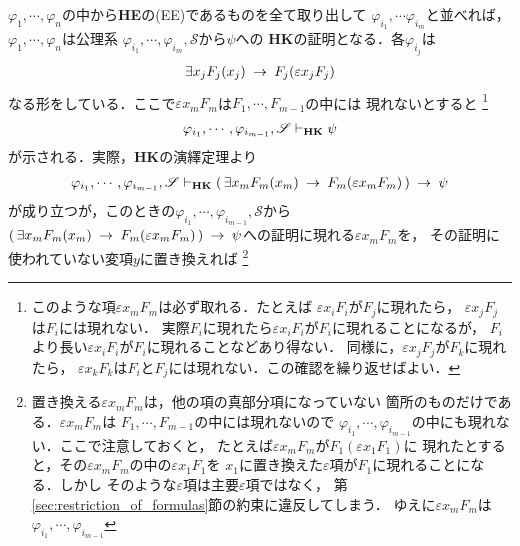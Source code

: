 	\begin{sketch}
		$\varphi_{1},\cdots,\varphi_{n}$の中から{\bf HE}の(EE)であるものを全て取り出して
		$\varphi_{i_{1}},\cdots\varphi_{i_{m}}$と並べれば，
		$\varphi_{1},\cdots,\varphi_{n}$は公理系
		$\varphi_{i_{1}},\cdots,\varphi_{i_{m}},\mathscr{S}$から$\psi$への
		{\bf HK}の証明となる．各$\varphi_{i_{j}}$は
		\begin{align}
			\exists x_{j} F_{j}(x_{j}) \hspace{0.25em}\rightarrow\hspace{0.25em} F_{j}(\varepsilon x_{j} F_{j})
		\end{align}
		なる形をしている．ここで$\varepsilon x_{m} F_{m}$は$F_{1},\cdots,F_{m-1}$の中には
		現れないとすると
		\footnote{
			このような項$\varepsilon x_{m} F_{m}$は必ず取れる．たとえば
			$\varepsilon x_{i} F_{i}$が$F_{j}$に現れたら，
			$\varepsilon x_{j} F_{j}$は$F_{i}$には現れない．
			実際$F_{i}$に現れたら$\varepsilon x_{i} F_{i}$が$F_{i}$に現れることになるが，
			$F_{i}$より長い$\varepsilon x_{i} F_{i}$が$F_{i}$に現れることなどあり得ない．
			同様に，$\varepsilon x_{j} F_{j}$が$F_{k}$に現れたら，
			$\varepsilon x_{k} F_{k}$は$F_{i}$と$F_{j}$には現れない．この確認を繰り返せばよい．
		}
		\begin{align}
			\varphi_{i_{1}},\cdots,\varphi_{i_{m-1}},\mathscr{S} 
			\vdash_{{\scriptsize \mbox{{\bf HK}}}} \psi
		\end{align}
		が示される．実際，{\bf HK}の演繹定理より
		\begin{align}
			\varphi_{i_{1}},\cdots,\varphi_{i_{m-1}},\mathscr{S} 
			\vdash_{{\scriptsize \mbox{{\bf HK}}}} 
			(\, \exists x_{m} F_{m}(x_{m}) \hspace{0.25em}\rightarrow\hspace{0.25em} F_{m}(\varepsilon x_{m} F_{m})\, ) \hspace{0.25em}\rightarrow\hspace{0.25em} \psi
		\end{align}
		が成り立つが，このときの$\varphi_{i_{1}},\cdots,\varphi_{i_{m-1}},\mathscr{S}$から
		$(\, \exists x_{m} F_{m}(x_{m}) \hspace{0.25em}\rightarrow\hspace{0.25em} F_{m}(\varepsilon x_{m} F_{m})\, ) 
		\hspace{0.25em}\rightarrow\hspace{0.25em} \psi$への証明に現れる$\varepsilon x_{m} F_{m}$を，
		その証明に使われていない変項$y$に置き換えれば
		\footnote{
			置き換える$\varepsilon x_{m} F_{m}$は，他の項の真部分項になっていない
			箇所のものだけである．$\varepsilon x_{m} F_{m}$は
			$F_{1},\cdots,F_{m-1}$の中には現れないので
			$\varphi_{i_{1}},\cdots,\varphi_{i_{m-1}}$の中にも現れない．ここで注意しておくと，
			たとえば$\varepsilon x_{m} F_{m}$が$F_{1}(\varepsilon x_{1} F_{1})$に
			現れたとすると，その$\varepsilon x_{m} F_{m}$の中の$\varepsilon x_{1} F_{1}$を
			$x_{1}$に置き換えた$\varepsilon$項が$F_{1}$に現れることになる．しかし
			そのような$\varepsilon$項は主要$\varepsilon$項ではなく，
			第\ref{sec:restriction_of_formulas}節の約束に違反してしまう．
			ゆえに$\varepsilon x_{m} F_{m}$は$\varphi_{i_{1}},\cdots,\varphi_{i_{m-1}}$
}
\end{sketch}

